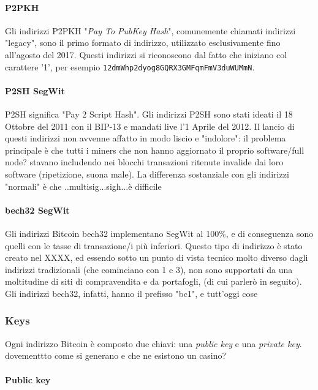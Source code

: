 \documentclass {article}
\begin{document}
\paragraph {P2PKH}

Gli indirizzi P2PKH "\textit{Pay To PubKey Hash}", comunemente chiamati indirizzi "legacy", sono il primo formato di indirizzo, utilizzato esclusivamente fino all'agosto del 2017.
Questi indirizzi si riconoscono dal fatto che iniziano col carattere '1', per esempio \texttt{12dmWhp2dyog8GQRX3GMFqmFmV3duWUMmN}.

\paragraph {P2SH SegWit}

P2SH significa "Pay 2 Script Hash".
Gli indirizzi P2SH sono stati ideati il 18 Ottobre del 2011 con il BIP-13 e mandati live l'1 Aprile del 2012.
Il lancio di questi indirizzi non avvenne affatto in modo liscio e "indolore": il problema principale è che tutti i miners che non hanno aggiornato il proprio software/full node? stavano includendo nei blocchi transazioni ritenute invalide dai loro software (ripetizione, suona male).
La differenza sostanziale con gli indirizzi "normali" è che ..multisig...sigh...è difficile

\paragraph {bech32 SegWit}

Gli indirizzi Bitcoin bech32 implementano SegWit al 100\%, e di conseguenza sono quelli con le tasse di transazione/i più inferiori.
Questo tipo di indirizzo è stato creato nel XXXX, ed essendo sotto un punto di vista tecnico molto diverso dagli indirizzi tradizionali (che cominciano con 1 e 3), non sono supportati da una moltitudine di siti di compravendita e da portafogli, (di cui parlerò in seguito).
Gli indirizzi bech32, infatti, hanno il prefisso "bc1", e tutt'oggi cose

\subsubsection {Keys}


Ogni indirizzo Bitcoin è composto due chiavi: una \textit{public key} e una \textit{private key}. dovementtto come si generano e che ne esistono un casino?

\paragraph {Public key}
\end{document}
